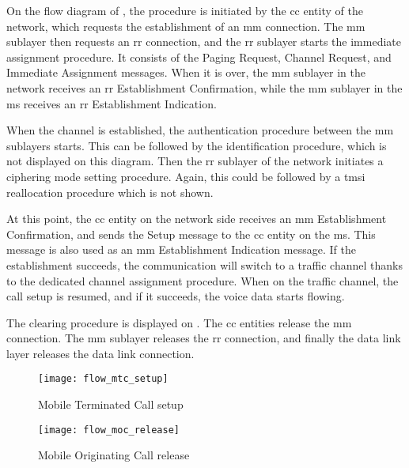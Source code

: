     On the flow diagram of , the procedure is
    initiated by the \gls{cc} entity of the network, which requests the
    establishment of an \gls{mm} connection. The \gls{mm} sublayer then
    requests an \gls{rr} connection, and the \gls{rr} sublayer starts
    the immediate assignment procedure. It consists of the Paging
    Request, Channel Request, and Immediate Assignment messages. When it
    is over, the \gls{mm} sublayer in the network receives an \gls{rr}
    Establishment Confirmation, while the \gls{mm} sublayer in the
    \gls{ms} receives an \gls{rr} Establishment Indication.

    When the channel is established, the authentication procedure
    between the \gls{mm} sublayers starts. This can be followed by the
    identification procedure, which is not displayed on this diagram.
    Then the \gls{rr} sublayer of the network initiates a ciphering mode
    setting procedure. Again, this could be followed by a \gls{tmsi}
    reallocation procedure which is not shown.
    
    At this point, the \gls{cc} entity on the network side receives an
    \gls{mm} Establishment Confirmation, and sends the Setup message to
    the \gls{cc} entity on the \gls{ms}. This message is also used as an
    \gls{mm} Establishment Indication message. If the establishment
    succeeds, the communication will switch to a traffic channel thanks
    to the dedicated channel assignment procedure. When on the traffic
    channel, the call setup is resumed, and if it succeeds, the voice
    data starts flowing.

    The clearing procedure is displayed on .
    The \gls{cc} entities release the \gls{mm} connection. The \gls{mm}
    sublayer releases the \gls{rr} connection, and finally the data link
    layer releases the data link connection.

      \begin{figure}[h]
        \centering
        \texttt{[image: flow\_mtc\_setup]}
        \caption{Mobile Terminated Call
        setup~\cite[p.~115]{3gpp_ts_2014-6}}
        \label{fig:flow_mtc_setup}
      \end{figure}

      \begin{figure}[h]
        \centering
        \texttt{[image: flow\_moc\_release]}
        \caption{Mobile Originating Call
        release~\cite[p.~116]{3gpp_ts_2014-6}}
        \label{fig:flow_moc_release}
      \end{figure}

